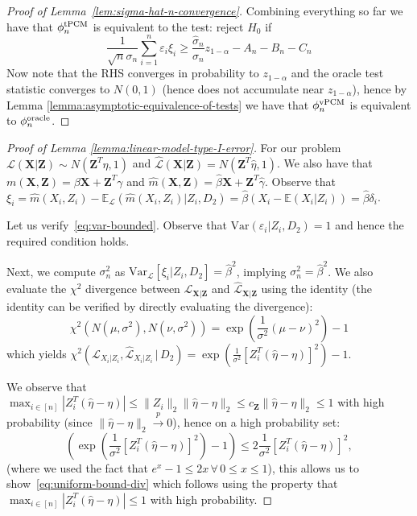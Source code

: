 \documentclass[12pt]{article}
\theoremstyle{definition}
\theoremstyle{remark}
\newcommand{\E}{\mathbb E}								%
\newcommand{\convp}{\overset p \rightarrow}             %
\newcommand{\prx}{\bm X}								%
\newcommand{\srx}{X}									%
\newcommand{\prz}{\bm Z}								%
\newcommand{\srz}{Z}									%
\newcommand{\law}{\mathcal L}							%
\newcommand{\lawhat}{\widehat{\mathcal L}}				%
\begin{document}
\begin{proof}[Proof of Lemma~\ref{lem:sigma-hat-n-convergence}]
	Combining everything so far we have that $\phi^{\textnormal{tPCM}}_n$ is equivalent to the test: reject $H_0$ if
	$$
	\frac{1}{\sqrt n\sigma_n} \sum_{i=1}^n \varepsilon_i\xi_i \geq \frac{\widehat \sigma_n}{\sigma_n}z_{1-\alpha} -A_n -B_n - C_n
	$$
	Now note that the RHS converges in probability to $z_{1-\alpha}$ and the oracle test statistic converges to $N(0,1)$ (hence does not accumulate near $z_{1-\alpha}$), hence by Lemma \ref{lemma:asymptotic-equivalence-of-tests} we have that $\phi^{\textnormal{vPCM}}_n$ is equivalent to $\phi^{\textnormal{oracle}}_n$. 
\end{proof}

\begin{proof}[Proof of Lemma \ref{lemma:linear-model-type-I-error}]
	For our problem $\law(\prx|\prz) \sim N(\prz^T\eta,1)  $ and $ \lawhat(\prx|\prz) = N(\prz^T \hat \eta, 1)$. We also have that $m(\prx,\prz) = \beta \prx + \prz^T \gamma$ and $\widehat m(\prx,\prz) = \hat \beta \prx + \prz^T\hat \gamma$. Observe that $\xi_i = \widehat m(\srx_i,\srz_i) - \E_\law (\widehat m(\srx_i,\srz_i) | \srz_i,D_2)  = \hat\beta (\srx_i - \E (\srx_i|\srz_i)) = \hat \beta \delta_i $.
	
	Let us verify~\eqref{eq:var-bounded}. Observe that $\mathrm{Var}(\varepsilon_i | \srz_i, D_2) = 1$ and hence the required condition holds.
	
	Next, we compute $\sigma^2_n$ as $\mathrm{Var}_\law[\xi_i | \srz_i, D_2] = \hat{\beta}^2$, implying $\sigma_n^2 = \hat{\beta}^2$. We also evaluate the $\chi^2$ divergence between $\law_{\prx | \prz}$ and $\lawhat_{\prx | \prz}$ using the identity (the identity can be verified by directly evaluating the divergence):
	$$
	\chi^2(N(\mu,\sigma^2), N(\nu, \sigma^2)) = \exp\left(\frac{1}{\sigma^2}(\mu-\nu)^2\right)-1 
	$$
	which yields $\chi^2(\law_{\srx_i | \srz_i}, \lawhat_{\srx_i | \srz_i} \,|\, D_2) = \exp\left(\frac{1}{\sigma^2}[\srz_i ^T(\hat\eta-\eta)]^2\right)-1$.
	
	We observe that $\max_{i \in [n]} |\srz_i^T(\hat \eta - \eta) |\leq \|\srz_i\|_2 \|\widehat\eta - \eta\|_2 \leq c_{\prz}\|\widehat\eta - \eta\|_2 \leq 1$ with high probability (since $\|\widehat\eta -\eta\|_2 \convp 0$), hence on a high probability set:
	\begin{equation}\label{eq:bound-on-chi-square-for-LM}
		\left(\exp\left(\frac{1}{\sigma^2}[\srz_i^T(\hat\eta-\eta)]^2\right) - 1\right) \leq 2\frac{1}{\sigma^2}[\srz_i^T(\hat\eta-\eta)]^2,
	\end{equation}
	(where we used the fact that $e^x -1 \leq 2x\,\forall\, 0\leq x\leq 1$), this allows us to   show~\eqref{eq:uniform-bound-div} which follows using the property that $\max_{i \in [n]} |\srz_i^T(\hat \eta - \eta) |\leq 1$ with high probability.
	

\end{proof}
\end{document}
